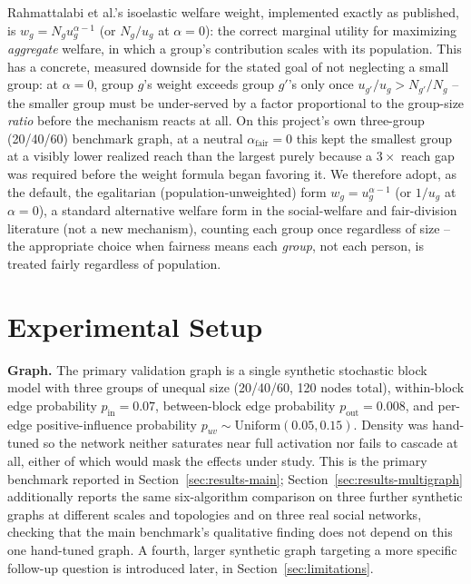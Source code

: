 \documentclass[journal]{IEEEtran}
\begin{document}
Rahmattalabi et al.'s isoelastic welfare weight, implemented exactly as
published, is $w_g=N_g u_g^{\alpha-1}$ (or $N_g/u_g$ at $\alpha=0$): the
correct marginal utility for maximizing \emph{aggregate} welfare, in which
a group's contribution scales with its population. This has a concrete,
measured downside for the stated goal of not neglecting a small group: at
$\alpha=0$, group $g$'s weight exceeds group $g'$'s only once
$u_{g'}/u_g > N_{g'}/N_g$ -- the smaller group must be under-served by a
factor proportional to the group-size \emph{ratio} before the mechanism
reacts at all. On this project's own three-group (20/40/60) benchmark
graph, at a neutral $\alpha_{\mathrm{fair}}=0$ this kept the smallest group
at a visibly lower realized reach than the largest purely because a
$3\times$ reach gap was required before the weight formula began favoring
it. We therefore adopt, as the default, the egalitarian
(population-unweighted) form $w_g=u_g^{\alpha-1}$ (or $1/u_g$ at
$\alpha=0$), a standard alternative welfare form in the social-welfare and
fair-division literature (not a new mechanism), counting each group once
regardless of size -- the appropriate choice when fairness means each
\emph{group}, not each person, is treated fairly regardless of population.

\section{Experimental Setup}
\label{sec:setup}

\textbf{Graph.} The primary validation graph is a single synthetic
stochastic block model with three groups of unequal size (20/40/60, 120
nodes total), within-block edge probability $p_{\mathrm{in}}=0.07$,
between-block edge probability $p_{\mathrm{out}}=0.008$, and per-edge
positive-influence probability $p_{uv}\sim\mathrm{Uniform}(0.05,0.15)$.
Density was hand-tuned so the network neither saturates near full
activation nor fails to cascade at all, either of which would mask the
effects under study. This is the primary benchmark reported in
Section~\ref{sec:results-main}; Section~\ref{sec:results-multigraph}
additionally reports the same six-algorithm comparison on three further
synthetic graphs at different scales and topologies and on three real
social networks, checking that the main benchmark's qualitative finding
does not depend on this one hand-tuned graph. A fourth, larger synthetic
graph targeting a more specific follow-up question is introduced later,
in Section~\ref{sec:limitations}.
\end{document}
